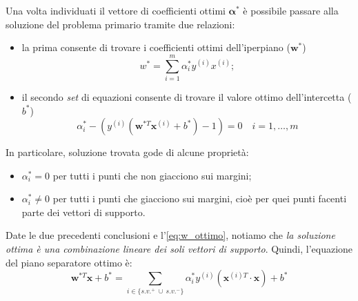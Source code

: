 Una volta individuati il vettore di coefficienti ottimi $\boldsymbol\alpha^*$ è possibile passare alla soluzione del problema primario tramite due relazioni:
\begin{itemize} 
\item la prima consente di trovare i coefficienti ottimi dell'iperpiano ($\mathbf{w}^*$)
\begin{equation}\label{eq:w_ottimo}
w^* = \sum_{i=1}^m \alpha_i^* y^{(i)} x^{(i)};
\end{equation}
\item il secondo \emph{set} di equazioni consente di trovare il valore ottimo dell'intercetta ($b^*$)
\begin{equation*}
\alpha_i^* -  ( y^{(i)} (\mathbf{w}^{*T} \mathbf{x}^{(i)} + b^*)-1 )=0 \quad i=1,\dots,m
\end{equation*}
\end{itemize}
In particolare, soluzione trovata gode di alcune proprietà:
\begin{itemize}
\item $\alpha_i^*=0$ per tutti i punti che non giacciono sui margini;
\item $\alpha_i^*\neq0$ per tutti i punti che giacciono sui margini, cioè per quei punti facenti parte dei vettori di supporto.
\end{itemize}
Date le due precedenti conclusioni e l'\autoref{eq:w_ottimo}, notiamo che \emph{la soluzione ottima è una combinazione lineare dei soli vettori di supporto}. Quindi, l'equazione del piano separatore ottimo è:
\begin{equation*}
\mathbf{w}^{*T} \mathbf{x} + b^* = \sum_{i \in \{s.v.^+~\cup~s.v.^-\}} \alpha_i^* y^{(i)}(\mathbf{x}^{(i)T} \cdot \mathbf{x}) + b^*
\end{equation*}

